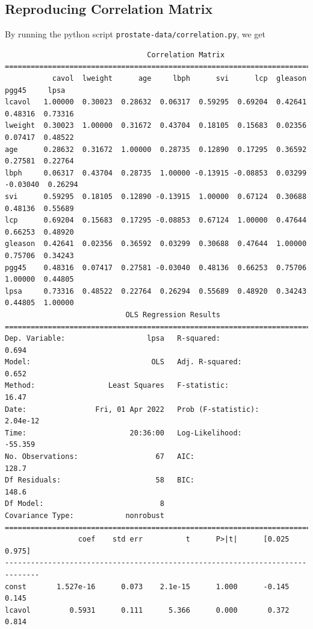 \documentclass[11pt]{article}
\theoremstyle{definition}
\begin{document}
\subsection{Reproducing Correlation Matrix}
By running the python script \texttt{prostate-data/correlation.py}, we get
	{\footnotesize
		\begin{verbatim}
                                 Correlation Matrix
========================================================================================
           cavol  lweight      age     lbph      svi      lcp  gleason    pgg45     lpsa
lcavol   1.00000  0.30023  0.28632  0.06317  0.59295  0.69204  0.42641  0.48316  0.73316
lweight  0.30023  1.00000  0.31672  0.43704  0.18105  0.15683  0.02356  0.07417  0.48522
age      0.28632  0.31672  1.00000  0.28735  0.12890  0.17295  0.36592  0.27581  0.22764
lbph     0.06317  0.43704  0.28735  1.00000 -0.13915 -0.08853  0.03299 -0.03040  0.26294
svi      0.59295  0.18105  0.12890 -0.13915  1.00000  0.67124  0.30688  0.48136  0.55689
lcp      0.69204  0.15683  0.17295 -0.08853  0.67124  1.00000  0.47644  0.66253  0.48920
gleason  0.42641  0.02356  0.36592  0.03299  0.30688  0.47644  1.00000  0.75706  0.34243
pgg45    0.48316  0.07417  0.27581 -0.03040  0.48136  0.66253  0.75706  1.00000  0.44805
lpsa     0.73316  0.48522  0.22764  0.26294  0.55689  0.48920  0.34243  0.44805  1.00000
                            OLS Regression Results                            
==============================================================================
Dep. Variable:                   lpsa   R-squared:                       0.694
Model:                            OLS   Adj. R-squared:                  0.652
Method:                 Least Squares   F-statistic:                     16.47
Date:                Fri, 01 Apr 2022   Prob (F-statistic):           2.04e-12
Time:                        20:36:00   Log-Likelihood:                -55.359
No. Observations:                  67   AIC:                             128.7
Df Residuals:                      58   BIC:                             148.6
Df Model:                           8                                         
Covariance Type:            nonrobust                                         
==============================================================================
                 coef    std err          t      P>|t|      [0.025      0.975]
------------------------------------------------------------------------------
const       1.527e-16      0.073    2.1e-15      1.000      -0.145       0.145
lcavol         0.5931      0.111      5.366      0.000       0.372       0.814

\end{verbatim}}
\end{document}
